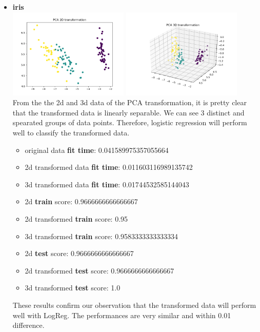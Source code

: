 \documentclass[12pt]{article}
\begin{document}
\begin{enumerate}[leftmargin=\parindent,align=left,labelwidth=\parindent,noitemsep]
\begin{itemize}[topsep=10pt]
    \item \textbf{iris} \\
    \includegraphics[width=0.45\textwidth]{pca_iris_2d} \includegraphics[width=0.45\textwidth]{pca_iris_3d} \\
    From the the 2d and 3d data of the PCA transformation, it is pretty clear that the transformed data is linearly separable. We can see 3 distinct and spearated groups of data points. Therefore, logistic regression will perform well to classify the transformed data.
    \begin{itemize}
        \item original data \textbf{fit time}: 0.041589975357055664
        \item 2d transformed data \textbf{fit time}: 0.011603116989135742
        \item 3d transformed data \textbf{fit time}: 0.01744532585144043 \\

        \item 2d \textbf{train} score: 0.9666666666666667
        \item 2d transformed \textbf{train} score: 0.95
        \item 3d transformed \textbf{train} score: 0.9583333333333334 \\

        \item 2d \textbf{test} score: 0.9666666666666667
        \item 2d transformed \textbf{test} score: 0.9666666666666667
        \item 3d transformed \textbf{test} score: 1.0
    \end{itemize}
    These results confirm our observation that the transformed data will perform well with LogReg. The performances are very similar and within 0.01 difference. 
\end{itemize}


\end{enumerate}
\end{document}
